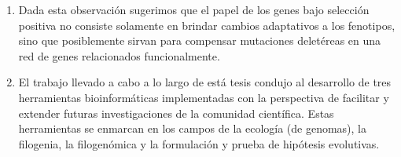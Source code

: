\begin{enumerate}
\item Dada esta observación sugerimos que el papel de los genes bajo selección positiva no consiste solamente en brindar cambios adaptativos a los fenotipos, sino que posiblemente sirvan para compensar mutaciones deletéreas en una red de genes relacionados funcionalmente.
\item El trabajo llevado a cabo a lo largo de está tesis condujo al desarrollo de tres herramientas bioinformáticas implementadas con la perspectiva de facilitar y extender futuras investigaciones de la comunidad científica. Estas herramientas se enmarcan en los campos de la ecología (de genomas), la filogenia, la filogenómica y la formulación y prueba de hipótesis evolutivas.
\end{enumerate}

